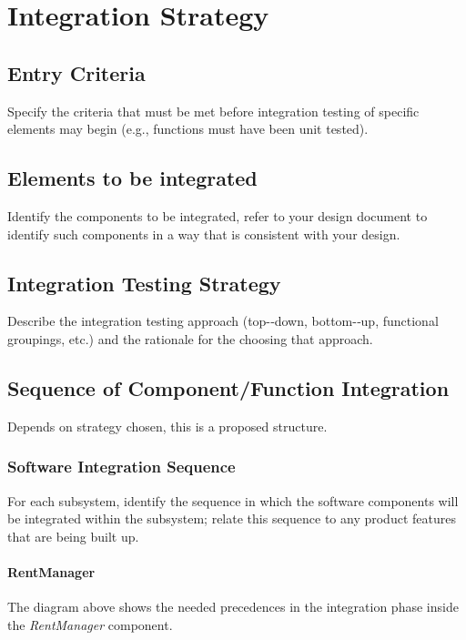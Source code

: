 \section{Integration Strategy}

\subsection{Entry Criteria}
Specify the criteria that must be met before integration testing of specific elements may begin (e.g., functions must have been unit tested).

\subsection{Elements to be integrated}
Identify the components to be integrated, refer to your design document to identify such components in a way that is consistent with your design.

\subsection{Integration Testing Strategy}
Describe the integration testing approach (top-­‐down, bottom-­‐up, functional groupings, etc.) and the rationale for the choosing that approach.

\subsection{Sequence of Component/Function Integration}
Depends on strategy chosen, this is a proposed structure.

\subsubsection{Software Integration Sequence}
For each subsystem, identify the sequence in which the software components will be integrated within the subsystem; relate this sequence to any product features that are being built up.

\paragraph{RentManager} 
The diagram above shows the needed precedences in the integration phase inside the \emph{RentManager} component.
\paragraph{}

